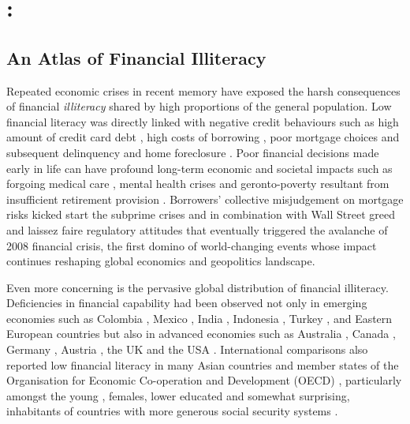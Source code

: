 \section{\MAEtitle: \MAEsubtitle}



\subsection{An Atlas of Financial Illiteracy}

Repeated economic crises in recent memory have exposed the harsh consequences of financial \emph{illiteracy} shared by high proportions of the general population. Low financial literacy was directly linked with negative credit behaviours such as high amount of credit card debt \parencite{norvilitis:2010}, high costs of borrowing \parencite{huston:2012, pak:2018}, poor mortgage choices \parencite{cox:2015} and subsequent delinquency and home foreclosure \parencite{agarwal:2015a, gerardi:2010}. Poor financial decisions made early in life can have profound long-term economic and societal impacts \parencite{montoya:2013} such as forgoing medical care \parencite{lusardi:2015}, mental health crises \parencite{stone:2018} and geronto-poverty resultant from insufficient retirement provision \parencite{lusardi:2007, lusardi:2008}. Borrowers' collective misjudgement on mortgage risks kicked start the subprime crises and in combination with Wall Street greed and laissez faire regulatory attitudes that eventually triggered the avalanche of 2008 financial crisis, the first domino of world-changing events whose impact continues reshaping global economics and geopolitics landscape.

Even more concerning is the pervasive global distribution of financial illiteracy. Deficiencies in financial capability had been observed not only in emerging economies \parencite{karakurumozdemir:2019} such as Colombia \parencite{caoalvira:2020}, Mexico \parencite{arceogomez:2017, bohm:2021}, India \parencite{agarwal:2015b, kiliyanni:2016, utkarsh:2020}, Indonesia \parencite{cole:2009, khoirunnisaa:2020}, Turkey \parencite{akbenselcuk:2014}, and Eastern European countries \parencite{belas:2016, opletalova:2015, reiter:2020} but also in advanced economies such as Australia \parencite{ali:2014, taylor:2013, thomson:2017}, Canada \parencite{boisclair:2017}, Germany \parencite{bucherkoenen:2017, erner:2016}, Austria \parencite{silgoner:2015}, the UK \parencite{barnard:2021} and the USA \parencite{breitbach:2016, gale:2012, lusardi:2010}. International comparisons also reported low financial literacy in many Asian countries \parencite{yoshino:2015} and member states of the Organisation for Economic Co-operation and Development (OECD) \parencite{cupak:2018a, lusardi:2015a}, particularly amongst the young \parencite{debeckker:2019}, females, lower educated \parencite{klapper:2019} and somewhat surprising, inhabitants of countries with more generous social security systems \parencite{jappelli:2010}.

